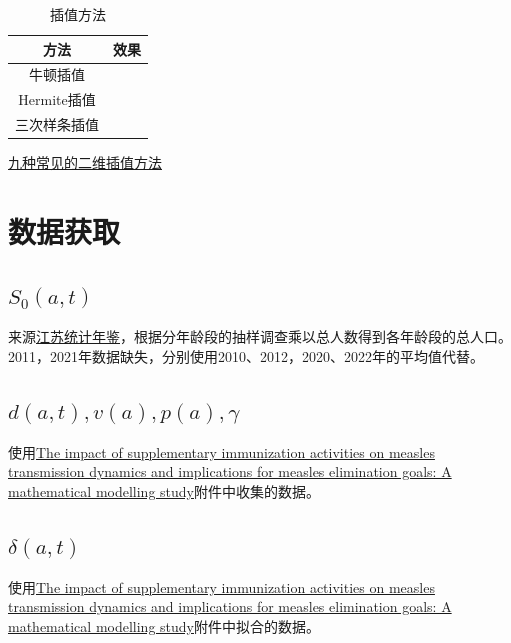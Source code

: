 \documentclass{article}
\numberwithin{figure}{section}
\numberwithin{equation}{section}
\numberwithin{table}{section}
\begin{document}
\begin{table}[h!]
  \begin{center}
    \caption{插值方法}
    \begin{tabular}{cc} %
\toprule
方法 & 效果 \\
\midrule
牛顿插值 & \\
Hermite插值 & \\
三次样条插值 & \\
\bottomrule
    \end{tabular}
  \end{center}
\end{table}

\href{https://blog.csdn.net/yanfeng1022/article/details/114528323}{九种常见的二维插值方法}

\section{数据获取}
\subsection{$S_0(a,t)$}
来源\href{https://tj.jiangsu.gov.cn/col/col89815/index.html}{江苏统计年鉴}，根据分年龄段的抽样调查乘以总人数得到各年龄段的总人口。2011，2021年数据缺失，分别使用2010、2012，2020、2022年的平均值代替。
\subsection{$d(a,t),v(a),p(a),\gamma$}
使用\href{https://www.sciencedirect.com/science/article/pii/S0022519322002375}{The impact of supplementary immunization activities on measles transmission dynamics and implications for measles elimination goals: A mathematical modelling study}\cite{SHEN2022111242}附件中{\color{red}收集}的数据。

\subsection{$\delta(a,t)$}
使用\href{https://www.sciencedirect.com/science/article/pii/S0022519322002375}{The impact of supplementary immunization activities on measles transmission dynamics and implications for measles elimination goals: A mathematical modelling study}\cite{SHEN2022111242}附件中{\color{red}拟合}的数据。

\printbibliography
\end{document}
